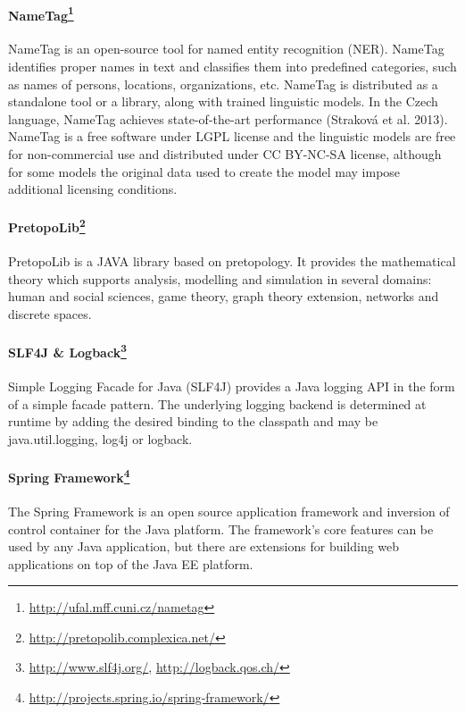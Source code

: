 \paragraph{NameTag\footnote{\url{http://ufal.mff.cuni.cz/nametag}}}
NameTag is an open-source tool for named entity recognition (NER). NameTag 
identifies proper names in text and classifies them into predefined categories,
such as names of persons, locations, organizations, etc. NameTag is distributed
as a standalone tool or a library, along with trained linguistic models.
In the Czech language, NameTag achieves state-of-the-art performance
(Straková et al. 2013). NameTag is a free software under LGPL license and the 
linguistic models are free for non-commercial use and distributed under CC 
BY-NC-SA license, although for some models the original data used to create
the model may impose additional licensing conditions.


\paragraph{PretopoLib\footnote{\url{http://pretopolib.complexica.net/}}}
PretopoLib is a JAVA library based on pretopology. It provides the mathematical 
theory which supports
analysis, modelling and simulation in several domains: human and social sciences,
game theory, graph theory extension, networks and discrete spaces.


\paragraph{SLF4J \& Logback\footnote{\url{http://www.slf4j.org/}, \url{http://logback.qos.ch/}}}
Simple Logging Facade for Java (SLF4J) provides a Java logging API in the form of
a simple facade pattern. The underlying logging backend is determined
at runtime by adding the desired binding to the classpath and may be
java.util.logging, log4j or logback.

\paragraph{Spring Framework\footnote{\url{http://projects.spring.io/spring-framework/}}}
The Spring Framework is an open source application framework and inversion
of control container for the Java platform. The framework's core features
can be used by any Java application, but there are extensions for building
web applications on top of the Java EE platform.

